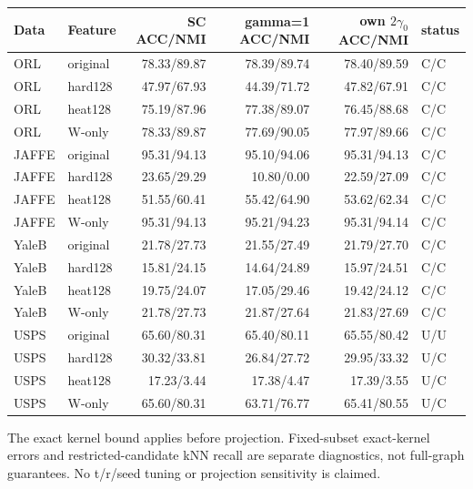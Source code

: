 \begin{center}\scriptsize\begin{tabular}{llrrrl}\toprule Data & Feature & SC ACC/NMI & gamma=1 ACC/NMI & own $2\gamma_0$ ACC/NMI & status \\\midrule
ORL & original & 78.33/89.87 & 78.39/89.74 & 78.40/89.59 & C/C \\
ORL & hard128 & 47.97/67.93 & 44.39/71.72 & 47.82/67.91 & C/C \\
ORL & heat128 & 75.19/87.96 & 77.38/89.07 & 76.45/88.68 & C/C \\
ORL & W-only & 78.33/89.87 & 77.69/90.05 & 77.97/89.66 & C/C \\
JAFFE & original & 95.31/94.13 & 95.10/94.06 & 95.31/94.13 & C/C \\
JAFFE & hard128 & 23.65/29.29 & 10.80/0.00 & 22.59/27.09 & C/C \\
JAFFE & heat128 & 51.55/60.41 & 55.42/64.90 & 53.62/62.34 & C/C \\
JAFFE & W-only & 95.31/94.13 & 95.21/94.23 & 95.31/94.14 & C/C \\
YaleB & original & 21.78/27.73 & 21.55/27.49 & 21.79/27.70 & C/C \\
YaleB & hard128 & 15.81/24.15 & 14.64/24.89 & 15.97/24.51 & C/C \\
YaleB & heat128 & 19.75/24.07 & 17.05/29.46 & 19.42/24.12 & C/C \\
YaleB & W-only & 21.78/27.73 & 21.87/27.64 & 21.83/27.69 & C/C \\
USPS & original & 65.60/80.31 & 65.40/80.11 & 65.55/80.42 & U/U \\
USPS & hard128 & 30.32/33.81 & 26.84/27.72 & 29.95/33.32 & U/C \\
USPS & heat128 & 17.23/3.44 & 17.38/4.47 & 17.39/3.55 & U/C \\
USPS & W-only & 65.60/80.31 & 63.71/76.77 & 65.41/80.55 & U/C \\
\bottomrule\end{tabular}\end{center}
The exact kernel bound applies before projection. Fixed-subset exact-kernel errors and restricted-candidate kNN recall are separate diagnostics, not full-graph guarantees. No t/r/seed tuning or projection sensitivity is claimed.
